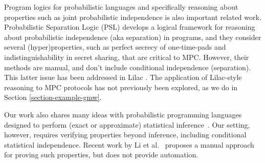 Program logics for probabilistic languages and specifically reasoning
about properties such as joint probabilistic independence is also
important related work. Probabilistic Separation Logic (PSL)
\cite{barthe2019probabilistic} develops a logical framework for
reasoning about probabilistic independence (aka separation) in
programs, and they consider several (hyper)properties, such as perfect
secrecy of one-time-pads and indistinguishability in secret sharing,
that are critical to MPC. However, their methods are manual, and
don't include conditional independence (separation). This
latter issue has been addressed in Lilac \cite{li2023lilac}. The
application of Lilac-style reasoning to MPC protocols has not
previously been explored, as we do in Section
\ref{section-example-gmw}.

Our work also shares many ideas with probabilistic programming
languages designed to perform (exact or approximate) statistical
inference~\cite{holtzen2020scaling,carpenter2017stan,wood2014new,bingham2019pyro,albarghouthi2017fairsquare,de2007problog,pfeffer2009figaro,saad2021sppl}. Our setting, however, requires
verifying properties beyond inference, including conditional
statistical independence. Recent work by Li et al.~\cite{li2023lilac} proposes a
manual approach for proving such properties, but does not provide
automation.

